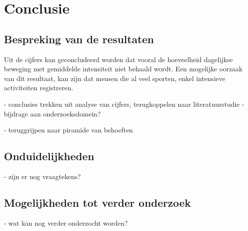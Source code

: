 
\chapter{Conclusie}%
\label{ch:conclusie}


\section{Bespreking van de resultaten}

Uit de cijfers kan geconcludeerd worden dat vooral de hoeveelheid dagelijkse beweging met gemiddelde intensiteit niet behaald wordt. Een mogelijke oorzaak van dit resultaat, kan zijn dat mensen die al veel sporten, enkel intensieve activiteiten registreren.

- conclusies trekken uit analyse van cijfers, terugkoppelen naar literatuurstudie
- bijdrage aan onderzoeksdomein?

- teruggrijpen naar piramide van behoeften

\section{Onduidelijkheden}

- zijn er nog vraagtekens?

\section{Mogelijkheden tot verder onderzoek}

- wat kan nog verder onderzocht worden?
